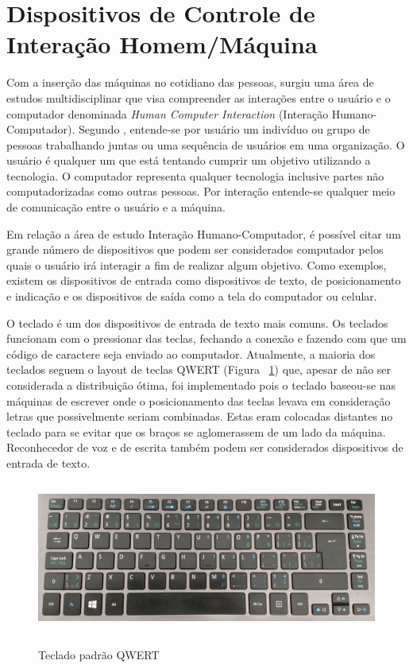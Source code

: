 \section{Dispositivos de Controle de Interação Homem/Máquina}
\label{s.dispositivos}

Com a inserção das máquinas no cotidiano das pessoas, surgiu uma área de estudos multidisciplinar que visa compreender as interações entre o usuário e o computador denominada \textit{Human Computer Interaction} (Interação Humano-Computador). Segundo , entende-se por usuário um indivíduo ou grupo de pessoas trabalhando juntas ou uma sequência de usuários em uma organização. O usuário é qualquer um que está tentando cumprir um objetivo utilizando a tecnologia. O computador representa qualquer tecnologia inclusive partes não computadorizadas como outras pessoas. Por interação entende-se qualquer meio de comunicação entre o usuário e a máquina.  

Em relação a área de estudo Interação Humano-Computador, é possível citar um grande número de dispositivos que podem ser considerados computador pelos quais o usuário irá interagir a fim de realizar algum objetivo. Como exemplos, existem os dispositivos de entrada como dispositivos de texto, de posicionamento e indicação e os dispositivos de saída como a tela do computador ou celular. 

O teclado é um dos dispositivos de entrada de texto mais comuns. Os teclados funcionam com o pressionar das teclas, fechando a conexão e fazendo com que um código de caractere seja enviado ao computador. Atualmente, a maioria dos teclados seguem o layout de teclas QWERT (Figura ~\ref{f.qwert}) que, apesar de não ser considerada a distribuição ótima, foi implementado pois o teclado baseou-se nas máquinas de escrever onde o posicionamento das teclas levava em consideração letras que possivelmente seriam combinadas. Estas eram colocadas distantes no teclado para se evitar que os braços se aglomerassem de um lado da máquina. Reconhecedor de voz e de escrita também podem ser considerados dispositivos de entrada de texto.

\begin{figure}[H]
	\caption{\small Teclado padrão QWERT}
	\centering
	\includegraphics[height= 5cm]{Imagens/qwert.jpg}
	\label{f.qwert}
\end{figure}

